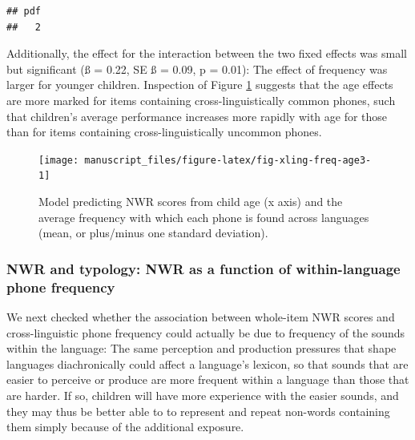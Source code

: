 \documentclass[
  american,
  ,man,floatsintext]{apa6}
\begin{document}
\begin{verbatim}
## pdf 
##   2
\end{verbatim}

Additionally, the effect for the interaction between the two fixed effects was small but significant (ß = 0.22, SE ß = 0.09, p = 0.01): The effect of frequency was larger for younger children. Inspection of Figure \ref{fig:fig-xling-freq-age3} suggests that the age effects are more marked for items containing cross-linguistically common phones, such that children's average performance increases more rapidly with age for those than for items containing cross-linguistically uncommon phones.

\begin{figure}[!t]

{\centering \texttt{[image: manuscript\_files/figure-latex/fig-xling-freq-age3-1]} 

}

\caption{Model predicting NWR scores from child age (x axis) and the average frequency with which each phone is found across languages (mean, or plus/minus one standard deviation).}\label{fig:fig-xling-freq-age3}
\end{figure}

\hypertarget{nwr-and-typology-nwr-as-a-function-of-within-language-phone-frequency}{%
\subsubsection{NWR and typology: NWR as a function of within-language phone frequency}\label{nwr-and-typology-nwr-as-a-function-of-within-language-phone-frequency}}

We next checked whether the association between whole-item NWR scores and cross-linguistic phone frequency could actually be due to frequency of the sounds within the language: The same perception and production pressures that shape languages diachronically could affect a language's lexicon, so that sounds that are easier to perceive or produce are more frequent within a language than those that are harder. If so, children will have more experience with the easier sounds, and they may thus be better able to to represent and repeat non-words containing them simply because of the additional exposure.
\end{document}

